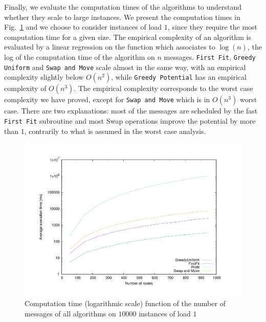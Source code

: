 \documentclass[a4paper,UKenglish,cleveref, autoref, thm-restate]{lipics-v2019}
\newcommand\firstfit{\texttt{First Fit}\xspace}
\newcommand\greedyuniform{\texttt{Greedy Uniform}\xspace}
\newcommand\swapandmove{\texttt{Swap and Move}\xspace}
\newcommand\greedypotential{\texttt{Greedy Potential}\xspace}
\begin{document}
 \medskip
 Finally, we evaluate the computation times of the algorithms to understand whether they scale to large instances. We present the computation times in Fig.~\ref{fig:timelog} and we choose to consider instances of load $1$, since they require the most computation time for a given size. The empirical complexity of an algorithm is evaluated by a
 linear regression on the function which associates to $\log(n)$, the log of the computation time of the algorithm on $n$ messages.  \firstfit, \greedyuniform and \swapandmove scale almost in the same way, with an empirical complexity slightly below $O(n^2)$, while \greedypotential has an empirical complexity of $O(n^3)$. The empirical complexity corresponds to the worst case complexity we have proved, except for \swapandmove which is in $O(n^3)$ worst case. There are two explanations: most of the messages are scheduled by the fast \firstfit subroutine and most Swap operations improve the potential by more than $1$, contrarily to what is assumed in the worst case analysis.

\begin{figure}
 \begin{center}
\includegraphics[scale=0.275]{log}
\end{center}
\caption{Computation time (logarithmic scale) function of the number of messages of all algorithms on $10000$ instances of load $1$}
\label{fig:timelog}
\end{figure}
\end{document}
